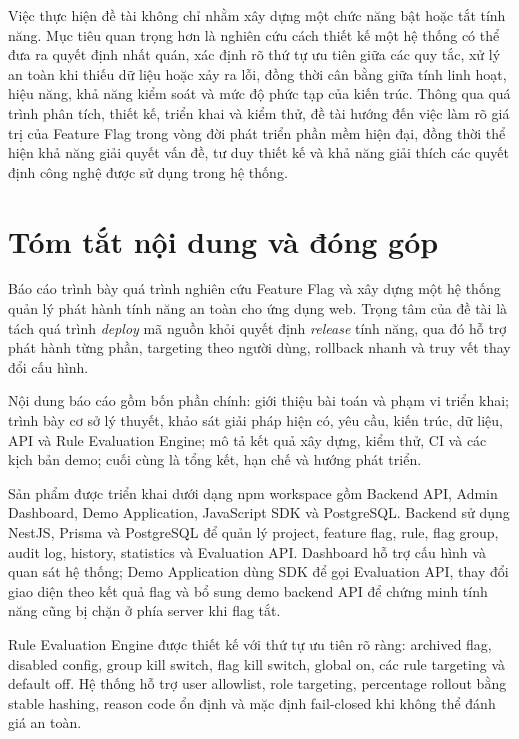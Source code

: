 \documentclass[11pt]{report}
\begin{document}
Việc thực hiện đề tài không chỉ nhằm xây dựng một chức năng bật hoặc tắt tính năng. Mục tiêu quan trọng hơn là nghiên cứu cách thiết kế một hệ thống có thể đưa ra quyết định nhất quán, xác định rõ thứ tự ưu tiên giữa các quy tắc, xử lý an toàn khi thiếu dữ liệu hoặc xảy ra lỗi, đồng thời cân bằng giữa tính linh hoạt, hiệu năng, khả năng kiểm soát và mức độ phức tạp của kiến trúc. Thông qua quá trình phân tích, thiết kế, triển khai và kiểm thử, đề tài hướng đến việc làm rõ giá trị của Feature Flag trong vòng đời phát triển phần mềm hiện đại, đồng thời thể hiện khả năng giải quyết vấn đề, tư duy thiết kế và khả năng giải thích các quyết định công nghệ được sử dụng trong hệ thống.



\chapter*{Tóm tắt nội dung và đóng góp}

Báo cáo trình bày quá trình nghiên cứu Feature Flag và xây dựng một hệ thống quản lý phát hành tính năng an toàn cho ứng dụng web. Trọng tâm của đề tài là tách quá trình \textit{deploy} mã nguồn khỏi quyết định \textit{release} tính năng, qua đó hỗ trợ phát hành từng phần, targeting theo người dùng, rollback nhanh và truy vết thay đổi cấu hình.

Nội dung báo cáo gồm bốn phần chính: giới thiệu bài toán và phạm vi triển khai; trình bày cơ sở lý thuyết, khảo sát giải pháp hiện có, yêu cầu, kiến trúc, dữ liệu, API và Rule Evaluation Engine; mô tả kết quả xây dựng, kiểm thử, CI và các kịch bản demo; cuối cùng là tổng kết, hạn chế và hướng phát triển.

Sản phẩm được triển khai dưới dạng npm workspace gồm Backend API, Admin Dashboard, Demo Application, JavaScript SDK và PostgreSQL. Backend sử dụng NestJS, Prisma và PostgreSQL để quản lý project, feature flag, rule, flag group, audit log, history, statistics và Evaluation API. Dashboard hỗ trợ cấu hình và quan sát hệ thống; Demo Application dùng SDK để gọi Evaluation API, thay đổi giao diện theo kết quả flag và bổ sung demo backend API để chứng minh tính năng cũng bị chặn ở phía server khi flag tắt.

Rule Evaluation Engine được thiết kế với thứ tự ưu tiên rõ ràng: archived flag, disabled config, group kill switch, flag kill switch, global on, các rule targeting và default off. Hệ thống hỗ trợ user allowlist, role targeting, percentage rollout bằng stable hashing, reason code ổn định và mặc định fail-closed khi không thể đánh giá an toàn.
\end{document}
